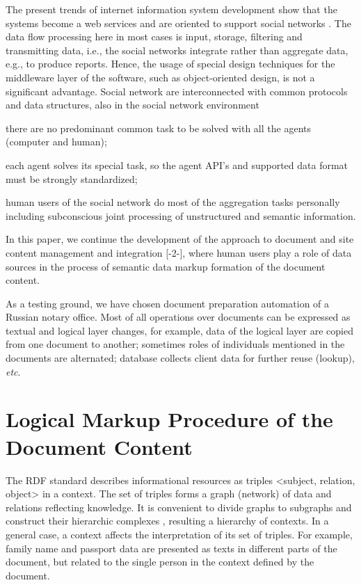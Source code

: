 \documentclass[conference]{IEEEtran}
\begin{document}
{{The present trends of internet information system development show that the systems become a web services and are oriented to support social networks \cite{b3}. The data flow processing here in most cases is input, storage, filtering and transmitting data, i.e., the social networks integrate rather than aggregate data, e.g., to produce reports. Hence, the usage of special design techniques for the middleware layer of the software, such as object-oriented design, is not a significant advantage. Social network are interconnected with common protocols and data structures, also in the social network environment

\begin{IEEEitemize}[\IEEEsetlabelwidth{Z}]
\item there are no predominant common task to be solved with all the agents (computer and human);
\item each agent solves its special task, so the agent API’s and supported data format must be strongly standardized;
\item human users of the social network do most of the aggregation tasks personally including subconscious joint processing of unstructured and semantic information.
\end{IEEEitemize}

In this paper, we continue the development of the approach to document and site content management and integration [-2-], where human users play a role of data sources in the process of semantic data markup formation of the document content.

As a testing ground, we have chosen document preparation automation of a Russian notary office. Most of all operations over documents can be expressed as textual and logical layer changes, for example, data of the logical layer are copied from one document to another; sometimes roles of individuals mentioned in the documents are alternated; database collects client data for further reuse (lookup), \emph{etc}.

\section{Logical Markup Procedure of the Document Content}

The RDF standard describes informational resources as triples <subject, relation, object> in a context. The set of triples forms a graph (network) of data and relations reflecting knowledge. It is convenient to divide graphs to subgraphs and construct their hierarchic complexes \cite{b4}, resulting a hierarchy of contexts. In a general case, a context affects the interpretation of its set of triples. For example, family name and passport data are presented as texts in different parts of the document, but related to the single person in the context defined by the document.

}}
\end{document}
